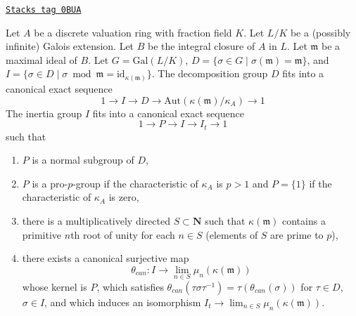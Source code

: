 \begin{lemma}
\label{pione-lemma-structure-decomposition}
\href{https://stacks.math.columbia.edu/tag/0BUA}{\texttt{Stacks tag 0BUA}}

Let $A$ be a discrete valuation ring with fraction field $K$.
Let $L/K$ be a (possibly infinite) Galois extension.
Let $B$ be the integral closure of $A$ in $L$.
Let $\mathfrak m$ be a maximal ideal of $B$.
Let $G = \text{Gal}(L/K)$,
$D = \{\sigma \in G \mid \sigma(\mathfrak m) = \mathfrak m\}$, and
$I = \{\sigma \in D \mid \sigma \bmod \mathfrak m =
\text{id}_{\kappa(\mathfrak m)}\}$.
The decomposition group $D$ fits into a canonical exact sequence
$$
1 \to I \to D \to \text{Aut}(\kappa(\mathfrak m)/\kappa_A) \to 1
$$
The inertia group $I$ fits into a canonical exact sequence
$$
1 \to P \to I \to I_t \to 1
$$
such that
\begin{enumerate}
\item $P$ is a normal subgroup of $D$,
\item $P$ is a pro-$p$-group if the characteristic of
$\kappa_A$ is $p > 1$ and $P = \{1\}$ if the characteristic of $\kappa_A$
is zero,
\item there is a multiplicatively directed $S \subset \mathbf{N}$
such that $\kappa(\mathfrak m)$ contains a primitive $n$th root of unity
for each $n \in S$ (elements of $S$ are prime to $p$),
\item there exists a canonical surjective map
$$
\theta_{can} : I \to \lim_{n \in S} \mu_n(\kappa(\mathfrak m))
$$
whose kernel is $P$, which satisfies
$\theta_{can}(\tau \sigma \tau^{-1}) = \tau(\theta_{can}(\sigma))$
for $\tau \in D$, $\sigma \in I$, and which induces an isomorphism
$I_t \to \lim_{n \in S} \mu_n(\kappa(\mathfrak m))$.
\end{enumerate}
\end{lemma}

